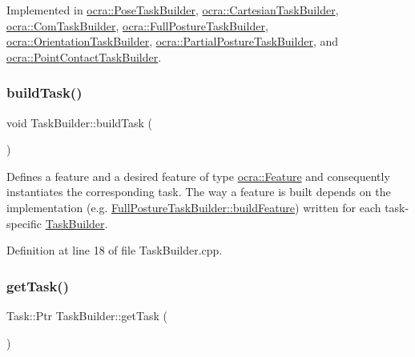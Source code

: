 Implemented in \hyperlink{classocra_1_1PoseTaskBuilder_a66fa4cdba48138741e19e642684a7006}{ocra\+::\+Pose\+Task\+Builder}, \hyperlink{classocra_1_1CartesianTaskBuilder_a308b204435c4063991d8101c0a8c512c}{ocra\+::\+Cartesian\+Task\+Builder}, \hyperlink{classocra_1_1ComTaskBuilder_abdd4c74539a37ff4c719c0ac78812bf4}{ocra\+::\+Com\+Task\+Builder}, \hyperlink{classocra_1_1FullPostureTaskBuilder_ac9ea83ee3f872995c6dc214e91fc28a0}{ocra\+::\+Full\+Posture\+Task\+Builder}, \hyperlink{classocra_1_1OrientationTaskBuilder_af5f11bdd9c43cb52e29054c6b293d533}{ocra\+::\+Orientation\+Task\+Builder}, \hyperlink{classocra_1_1PartialPostureTaskBuilder_a1a853459b32e838d04205459c608f5b2}{ocra\+::\+Partial\+Posture\+Task\+Builder}, and \hyperlink{classocra_1_1PointContactTaskBuilder_a253f8fffbd548b63badee23e2c42eb95}{ocra\+::\+Point\+Contact\+Task\+Builder}.

\hypertarget{classocra_1_1TaskBuilder_a84109a9bca0da0b2f7220b183e7d032d}{}\label{classocra_1_1TaskBuilder_a84109a9bca0da0b2f7220b183e7d032d} 
\subsubsection{\texorpdfstring{build\+Task()}{buildTask()}}
{\footnotesize\ttfamily void Task\+Builder\+::build\+Task (\begin{DoxyParamCaption}{ }\end{DoxyParamCaption})}

Defines a feature and a desired feature of type \hyperlink{classocra_1_1Feature}{ocra\+::\+Feature} and consequently instantiates the corresponding task. The way a feature is built depends on the implementation (e.\+g. \hyperlink{classocra_1_1FullPostureTaskBuilder_a7651ca4fd2ef7c8096a399b128981122}{Full\+Posture\+Task\+Builder\+::build\+Feature}) written for each task-\/specific \hyperlink{classocra_1_1TaskBuilder}{Task\+Builder}. 

Definition at line 18 of file Task\+Builder.\+cpp.

\hypertarget{classocra_1_1TaskBuilder_a31a863f23c736bcfa9f1f4c5e24d4859}{}\label{classocra_1_1TaskBuilder_a31a863f23c736bcfa9f1f4c5e24d4859} 
\subsubsection{\texorpdfstring{get\+Task()}{getTask()}}
{\footnotesize\ttfamily Task\+::\+Ptr Task\+Builder\+::get\+Task (\begin{DoxyParamCaption}{ }\end{DoxyParamCaption})}

